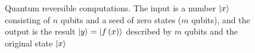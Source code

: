 \begin{figure}
\centering



\caption{Quantum reversible computations. The input is a number
  $\ket{x}$ consisting of $n$ qubits and a seed of zero
  states ($m$ qubits), and the output is the result $\ket{y} =
  \left|f\left(x\right)\right>$ described by $m$ qubits and the original
  state $\ket{x}$} 
\label{figQuantCompQuantComp}
\end{figure}